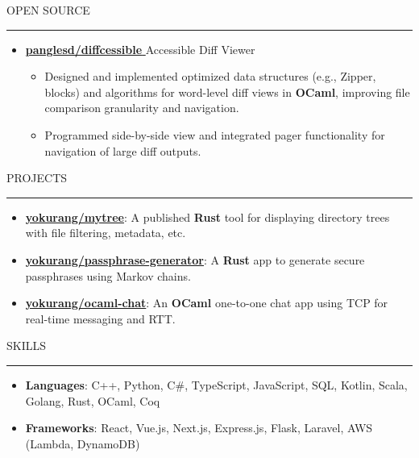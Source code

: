 \documentclass[letterpaper, 11pt]{article}
\def\sectionlineskip{\medskip}
\def\sectionskip{\medskip}
\def \entryspacing {-0pt}
\newcommand{\SectionHeading}[1]{
  \sectionskip
  \raggedright\raggedbottom\MakeUppercase{\large{#1}}
  \sectionlineskip
  \hrule
  \color{black}
}
\newcommand{\ResumeItem}[2]{
  \item{
    \textbf{#1}{: #2 \vspace{-2.835pt}}
  }
}
\newcommand{\ResumeItemDefault}[1]{
  \item{
    #1 \vspace{-2.835pt}
  }
}
\newcommand{\ResumeProjectItem}[3]{
  \item{
    \href{#2}{\textbf{#1}}{: #3 \vspace{-2.835pt}}
  }
}
\newcommand{\ResumeEntryStart}{\begin{itemize}[leftmargin=0mm, label={}]}
\newcommand{\ResumeEntryEnd}{\end{itemize}\vspace{-2.835pt}} %
\newcommand{\ResumeItemListStart}{\begin{itemize}[leftmargin=5mm, label=$\bullet$, itemsep=1mm, parsep=1mm]} %
\newcommand{\ResumeItemListEnd}{\end{itemize}}
\newcommand{\ProjectItemListStart}{\begin{itemize}[leftmargin=*, label=$\bullet$]}
\newcommand{\ProjectItemListEnd}{\end{itemize}\vspace{\entryspacing}}
\newcommand{\OpenSourceProjectItem}[3]{
  \item{
    \href{#1}{\textbf{#2} }\hfill{#3}\vspace{-2.835pt}
  }
}
\begin{document}
  \SectionHeading{Open Source}
  \ResumeEntryStart
  \OpenSourceProjectItem{https://github.com/panglesd/diffcessible}{panglesd/diffcessible}{Accessible Diff Viewer}
  \ResumeItemListStart
  \ResumeItemDefault{Designed and implemented optimized data structures (e.g., Zipper, blocks) and algorithms for word-level diff views in \textbf{OCaml}, improving file comparison granularity and navigation.}
  \ResumeItemDefault{Programmed side-by-side view and integrated pager functionality for navigation of large diff outputs.}
  \ResumeItemListEnd
  \ResumeEntryEnd

  \SectionHeading{Projects}
  \ProjectItemListStart
    \ResumeProjectItem{yokurang/mytree}
    {https://github.com/yokurang/mytree}
    {A published \textbf{Rust} tool for displaying directory trees with file filtering, metadata, etc.}
    \ResumeProjectItem{yokurang/passphrase-generator}
    {https://github.com/yokurang/passphrase-generator}
    {A \textbf{Rust} app to generate secure passphrases using Markov chains.}
    \ResumeProjectItem{yokurang/ocaml-chat}
    {https://github.com/yokurang/ocaml-chat}
    {An \textbf{OCaml} one-to-one chat app using TCP for real-time messaging and RTT.}
  \ProjectItemListEnd

  \SectionHeading{Skills}
  \ResumeEntryStart
    \ResumeItem{Languages}{ C++, Python, C\#, TypeScript, JavaScript, SQL, Kotlin, Scala, Golang, Rust, OCaml, Coq }
    \ResumeItem{Frameworks}{ React, Vue.js, Next.js, Express.js, Flask, Laravel, AWS (Lambda, DynamoDB) }
  \ResumeEntryEnd
\end{document}
